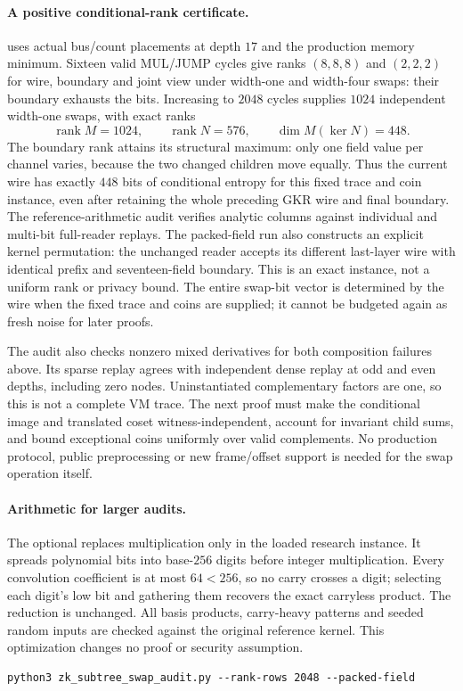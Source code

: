 \documentclass[11pt]{article}
\begin{document}
\paragraph{A positive conditional-rank certificate.}  uses actual bus/count placements at depth $17$ and the production memory minimum. Sixteen valid MUL/JUMP cycles give ranks $(8,8,8)$ and $(2,2,2)$ for wire, boundary and joint view under width-one and width-four swaps: their boundary exhausts the bits. Increasing to $2048$ cycles supplies $1024$ independent width-one swaps, with exact ranks
\[
 \operatorname{rank}M=1024,\qquad \operatorname{rank}N=576,
 \qquad\dim M(\ker N)=448.
\]
The boundary rank attains its structural maximum: only one field value per channel varies, because the two changed children move equally. Thus the current wire has exactly $448$ bits of conditional entropy for this fixed trace and coin instance, even after retaining the whole preceding GKR wire and final boundary. The reference-arithmetic audit verifies analytic columns against individual and multi-bit full-reader replays. The packed-field run also constructs an explicit kernel permutation: the unchanged reader accepts its different last-layer wire with identical prefix and seventeen-field boundary. This is an exact instance, not a uniform rank or privacy bound. The entire swap-bit vector is determined by the wire when the fixed trace and coins are supplied; it cannot be budgeted again as fresh noise for later proofs.

The audit also checks nonzero mixed derivatives for both composition failures above. Its sparse replay agrees with independent dense replay at odd and even depths, including zero nodes. Uninstantiated complementary factors are one, so this is not a complete VM trace. The next proof must make the conditional image and translated coset witness-independent, account for invariant child sums, and bound exceptional coins uniformly over valid complements. No production protocol, public preprocessing or new frame/offset support is needed for the swap operation itself.

\paragraph{Arithmetic for larger audits.} The optional  replaces multiplication only in the loaded research instance. It spreads polynomial bits into base-$256$ digits before integer multiplication. Every convolution coefficient is at most $64<256$, so no carry crosses a digit; selecting each digit's low bit and gathering them recovers the exact carryless product. The reduction is unchanged. All basis products, carry-heavy patterns and seeded random inputs are checked against the original reference kernel. This optimization changes no proof or security assumption.
\begin{verbatim}
python3 zk_subtree_swap_audit.py --rank-rows 2048 --packed-field
\end{verbatim}
\end{document}
